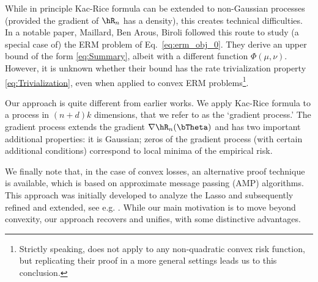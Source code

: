 While in principle Kac-Rice formula can be extended to non-Gaussian processes
(provided the gradient of $\hR_n$ has a density), this creates technical difficulties.  
In a notable paper, Maillard, Ben Arous, Biroli \cite{maillard2020landscape} 
followed this route to study (a special case of) the ERM problem
of Eq.~\eqref{eq:erm_obj_0}. They derive an upper bound
of the form \eqref{eq:Summary}, albeit with a different function 
$\Phi(\mu,\nu)$. However, it is unknown whether their bound has
the rate trivialization property \eqref{eq:Trivialization},
even when applied to convex ERM problems\footnote{Strictly speaking, \cite{maillard2020landscape} does not apply to any non-quadratic convex risk function, but replicating their proof in a more general settings leads us to this conclusion.}.

Our approach is quite different from earlier works.
We apply Kac-Rice formula to a process in $(n+d)k$ dimensions,
that we refer to as the `gradient process.'
The gradient process extends the gradient $\nabla \hR_n(\bTheta)$ and has two important additional properties: it is Gaussian;
zeros of the gradient process (with certain additional conditions) correspond to local minima of the empirical risk.

We finally note that, in the case of convex losses, an alternative proof technique is available,
which is based on approximate message passing (AMP) algorithms. This approach was initially developed to
analyze the Lasso \cite{BayatiMontanariLASSO} and subsequently refined and extended, see e.g.
\cite{donoho2016high,sur2019modern,loureiro2021learning,ccakmak2024convergence}.
While our main motivation is to move beyond convexity, our approach recovers and unifies,
with some distinctive advantages.